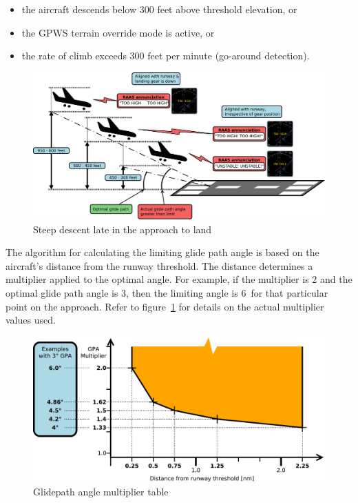 \documentclass[a4paper,12pt]{article}
\begin{document}
\begin{itemize}

\item the aircraft descends below 300 feet above threshold elevation, or

\item the GPWS terrain override mode is active, or

\item the rate of climb exceeds 300 feet per minute (go-around
detection).

\end{itemize}

\begin{figure}[H]
\begin{center}
\includegraphics[width=\textwidth]{../src/apch_too_hig.pdf}
\end{center}
\caption{Steep descent late in the approach to land}
\end{figure}

\noindent The algorithm for calculating the limiting glide path angle is
based on the aircraft's distance from the runway threshold. The distance
determines a multiplier applied to the optimal angle. For example, if the
multiplier is 2 and the optimal glide path angle is 3\degree, then the
limiting angle is 6\degree\ for that particular point on the approach.
Refer to figure~\ref{fig:GPATable} for details on the actual multiplier
values used.

\begin{figure}[H]
\begin{center}
\includegraphics[width=\textwidth]{../src/gpa_mult_table.pdf}
\end{center}
\caption{Glidepath angle multiplier table}
\label{fig:GPATable}
\end{figure}
\end{document}

